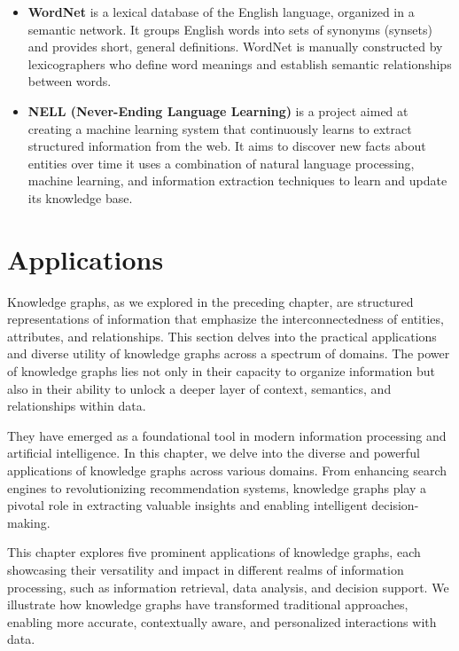 \begin{itemize}
    \item \textbf{WordNet} is a lexical database of the English language, organized in a semantic network. It groups English words into sets of synonyms (synsets) and provides short, general definitions. WordNet is manually constructed by lexicographers who define word meanings and establish semantic relationships between words.
    
    \item \textbf{NELL (Never-Ending Language Learning)} is a project aimed at creating a machine learning system that continuously learns to extract structured information from the web. It aims to discover new facts about entities over time it uses a combination of natural language processing, machine learning, and information extraction techniques to learn and update its knowledge base.
\end{itemize}

\section{Applications}\label{sec:kgs-applications}

Knowledge graphs, as we explored in the preceding chapter, are structured representations of information that emphasize the interconnectedness of entities, attributes, and relationships. This section delves into the practical applications and diverse utility of knowledge graphs across a spectrum of domains. The power of knowledge graphs lies not only in their capacity to organize information but also in their ability to unlock a deeper layer of context, semantics, and relationships within data. 

They have emerged as a foundational tool in modern information processing and artificial intelligence. In this chapter, we delve into the diverse and powerful applications of knowledge graphs across various domains. From enhancing search engines to revolutionizing recommendation systems, knowledge graphs play a pivotal role in extracting valuable insights and enabling intelligent decision-making.

This chapter explores five prominent applications of knowledge graphs, each showcasing their versatility and impact in different realms of information processing, such as information retrieval, data analysis, and decision support. We illustrate how knowledge graphs have transformed traditional approaches, enabling more accurate, contextually aware, and personalized interactions with data.

